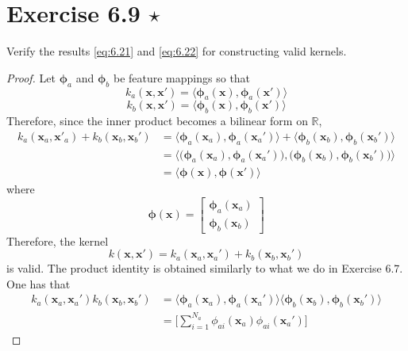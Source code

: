 \section*{Exercise 6.9 $\star$}
Verify the results \eqref{eq:6.21} and \eqref{eq:6.22} for constructing valid kernels.

\vspace{1em}

\begin{proof}
    Let $\bm{\phi}_a$ and $\bm{\phi}_b$ be feature mappings so that
    \[
        k_a(\mathbf{x}, \mathbf{x}') 
        = \langle\bm{\phi}_a(\mathbf{x}), \bm{\phi}_a(\mathbf{x}')\rangle
    \] 
    \[
        k_b(\mathbf{x}, \mathbf{x}') 
        = \langle\bm{\phi}_b(\mathbf{x}), \bm{\phi}_b(\mathbf{x}')\rangle
    \] 
    Therefore, since the inner product becomes a bilinear form on $\mathbb{R}$,
    \begin{align*}
        k_a(\mathbf{x}_a, \mathbf{x'}_a) + k_b(\mathbf{x}_b, \mathbf{x}_b')
        &= \langle\bm{\phi}_a(\mathbf{x}_a), \bm{\phi}_a(\mathbf{x}_a')\rangle
        + \langle\bm{\phi}_b(\mathbf{x}_b), \bm{\phi}_b(\mathbf{x}_b')\rangle \\
        &= \langle \big(\bm{\phi}_a(\mathbf{x}_a), \bm{\phi}_a(\mathbf{x}_a')\big),
        \big(\bm{\phi}_b(\mathbf{x}_b), \bm{\phi}_b(\mathbf{x}_b')\big) \rangle \\
        &= \langle \bm{\phi}(\mathbf{x}), \bm{\phi}(\mathbf{x'}) \rangle
    \end{align*}
    where
    \[
        \bm{\phi}(\mathbf{x}) = 
        \begin{bmatrix}
            \bm{\phi}_a(\mathbf{x}_a) \\
            \bm{\phi}_b(\mathbf{x}_b)
        \end{bmatrix}
    \] 
    Therefore, the kernel 
    \begin{equation}\label{eq:6.21}\tag{6.21}
        k(\mathbf{x}, \mathbf{x}') = 
        k_a(\mathbf{x}_a, \mathbf{x}_a') +
        k_b(\mathbf{x}_b, \mathbf{x}_b')
    \end{equation}
    is valid. The product identity is obtained similarly to
    what we do in Exercise 6.7. One has that
    \begin{align*}
        k_a(\mathbf{x}_a, \mathbf{x}_a')k_b(\mathbf{x}_b, \mathbf{x}_b')
        &= \langle\bm{\phi}_a(\mathbf{x}_a), \bm{\phi}_a(\mathbf{x}_a')\rangle
        \langle\bm{\phi}_b(\mathbf{x}_b), \bm{\phi}_b(\mathbf{x}_b')\rangle \\
        &= \bigg[\sum_{i=1}^{N_a} \phi_{ai}(\mathbf{x}_a) \phi_{ai}(\mathbf{x}_a')\bigg]

\end{align*}
\end{proof}

